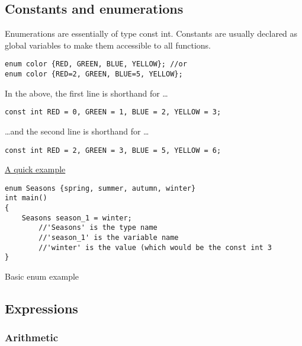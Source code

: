 \subsection{Constants and enumerations}
Enumerations are essentially of type const int. Constants are usually declared as global variables to
make them accessible to all functions.
\begin{verbatim}
enum color {RED, GREEN, BLUE, YELLOW}; //or
enum color {RED=2, GREEN, BLUE=5, YELLOW};
\end{verbatim}
\noindent
In the above, the first line is shorthand for \ldots
\begin{verbatim}
const int RED = 0, GREEN = 1, BLUE = 2, YELLOW = 3;
\end{verbatim}
\noindent
\ldots and the second line is shorthand for \ldots
\begin{verbatim}
const int RED = 2, GREEN = 3, BLUE = 5, YELLOW = 6;
\end{verbatim}

\noindent
\underline{A quick example}
\begin{listing}[h]
\begin{verbatim}
enum Seasons {spring, summer, autumn, winter}
int main()
{
	Seasons season_1 = winter;
		//'Seasons' is the type name
		//'season_1' is the variable name
		//'winter' is the value (which would be the const int 3
}
\end{verbatim}
\caption{Basic enum example}
\label{source_code_4}
\end{listing}


\subsection{Expressions}
\subsubsection*{Arithmetic}

